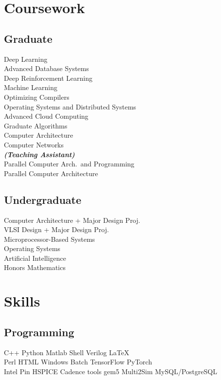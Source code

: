 \documentclass[]{resume}
\begin{document}
\begin{minipage}[t]{0.35\textwidth}

\section{Coursework}
\subsection{Graduate}
Deep Learning \\
Advanced Database Systems \\
Deep Reinforcement Learning \\
Machine Learning \\
Optimizing Compilers \\
Operating Systems and Distributed Systems \\
Advanced Cloud Computing \\
Graduate Algorithms \\
Computer Architecture \\
Computer Networks \\
{\footnotesize \textit{\textbf{(Teaching Assistant)}}} \\
Parallel Computer Arch.\ and Programming \\
Parallel Computer Architecture
\sectionsep%

\subsection{Undergraduate}
Computer Architecture + Major Design Proj. \\
VLSI Design + Major Design Proj. \\
Microprocessor-Based Systems \\
Operating Systems \\
Artificial Intelligence \\
Honors Mathematics


\section{Skills}
\subsection{Programming}
C++ \textbullet{} Python \textbullet{} Matlab \textbullet{} Shell \textbullet{}
Verilog \textbullet{} \LaTeX%
\\
Perl \textbullet{} HTML \textbullet{} Windows Batch
\textbullet{} TensorFlow \textbullet{} PyTorch \\
Intel Pin \textbullet{} HSPICE \textbullet{} Cadence tools \textbullet{}
gem5 \textbullet{} Multi2Sim \textbullet{} MySQL/PostgreSQL
\sectionsep%

%
%

\end{minipage}
\end{document}
